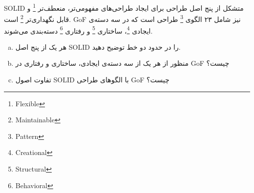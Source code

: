 SOLID
متشکل از پنج اصل طراحی برای ایجاد طراحی‌های مفهومی‌تر، منعطف‌تر \footnote{Flexible} و قابل نگهداری‌تر \footnote{Maintainable} است. GoF نیز شامل ۲۳ الگوی \footnote{Pattern} طراحی است که در سه دسته‌ی ایجادی \footnote{Creational}، ساختاری \footnote{Structural} و رفتاری \footnote{Behavioral} دسته‌بندی می‌شوند. 


\begin{enumerate}[a)]
	\item
هر یک از پنج اصل SOLID را در حدود دو خط توضیح دهید.
	\item
 منظور از هر یک از سه دسته‌ی ایجادی، ساختاری و رفتاری در GoF چیست؟
 	\item
تفاوت اصول SOLID با الگوهای طراحی GoF چیست؟
\end{enumerate}


